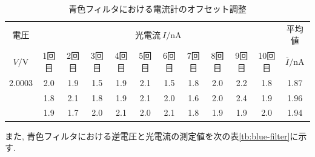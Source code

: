 \documentclass{jarticle}
\begin{document}
\begin{table}[H]
  \caption{青色フィルタにおける電流計のオフセット調整}
  \label{tb:blue-filter-offset}
  \hspace{-2.5cm}
  \begin{tabular}{cccccccccccc}
    \hline
    電圧 & \multicolumn{10}{c}{光電流$\ I/\mathrm{nA}$} & 平均値 \\
    $V/\mathrm{V}$ & 1回目 & 2回目 & 3回目 & 4回目 & 5回目 & 6回目 & 7回目 & 8回目 & 9回目 & 10回目 & $\overline{I}/\mathrm{nA}$ \\
    \hline
    2.0003 & 2.0 & 1.9 & 1.5 & 1.9 & 2.1 & 1.5 & 1.8 & 2.0 & 2.2 & 1.8 & 1.87 \\
    & 1.8 & 2.1 & 1.8 & 1.9 & 2.1 & 2.0 & 1.6 & 2.0 & 2.4 & 1.9 & 1.96 \\
    & 1.9 & 1.7 & 2.0 & 2.1 & 2.0 & 2.1 & 1.8 & 1.9 & 1.9 & 2.0 & 1.94 \\
    \hline
  \end{tabular}
\end{table}

また, 青色フィルタにおける逆電圧と光電流の測定値を次の表\ref{tb:blue-filter}に示す.
\end{document}
